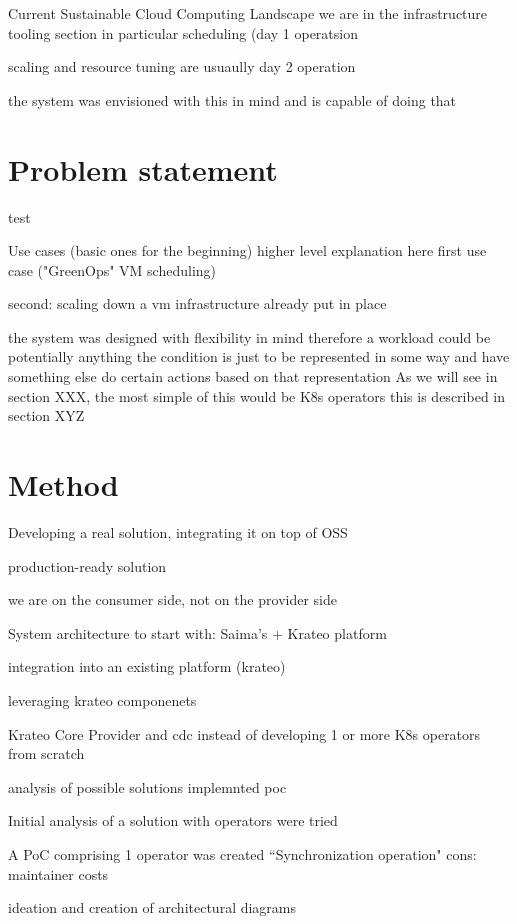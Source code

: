 Current Sustainable Cloud Computing Landscape
we are in the infrastructure tooling section
in particular scheduling (day 1 operatsion

scaling and resource tuning are usuaully day 2 operation

the system was envisioned with this in mind and is capable of doing that

\section{Problem statement}
\label{sec:problem}

test


Use cases (basic ones for the beginning) higher level explanation here
first use case ("GreenOps" VM scheduling)

second: scaling down a vm 
infrastructure already put in place

the system was designed with flexibility in mind therefore a workload could be potentially anything
the condition is just to be represented in some way and have something else do certain actions based on that representation
As we will see in section XXX, the most simple of this would be K8s operators
this is described in section XYZ

\section{Method}

Developing a real solution, integrating it on top of OSS

production-ready solution

we are on the consumer side, not on the provider side

System architecture to start with: Saima's + Krateo platform

integration into an existing platform (krateo)


leveraging krateo componenets

Krateo Core Provider and cdc instead of developing 1 or more K8s operators from scratch


analysis of possible solutions
implemnted poc 

Initial analysis of a solution with operators were tried

A PoC comprising 1 operator was created 
``Synchronization operation"
cons: maintainer costs



ideation and creation of architectural diagrams



